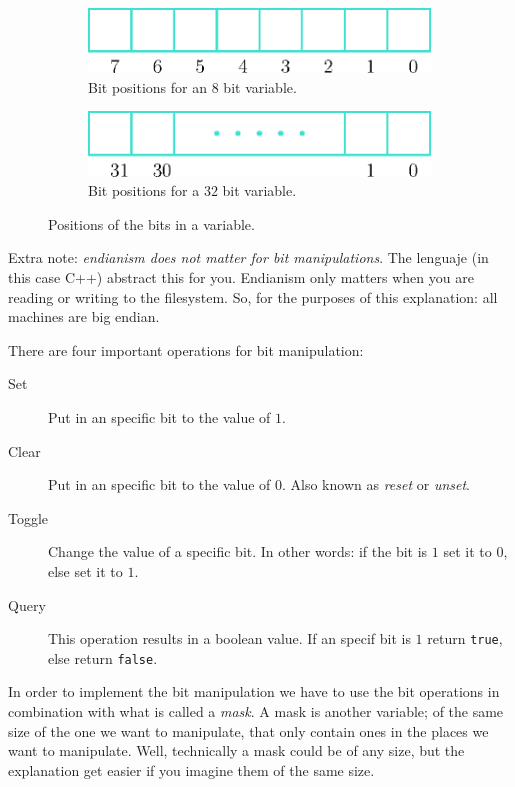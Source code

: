 \begin{figure}[htb]
  \centering
  \begin{subfigure}[b]{0.35\textwidth}
    \includegraphics[width=\textwidth]{img/bitPositions}
    \caption{Bit positions for an $8$ bit variable.}
    \label{fig:bitPosa}
  \end{subfigure}
  \hspace*{1cm}
  \begin{subfigure}[b]{0.35\textwidth}
    \includegraphics[width=\textwidth]{img/bitPositions2}
    \caption{Bit positions for a $32$ bit variable.}
    \label{fig:bitPosb}
  \end{subfigure}
  \caption{Positions of the bits in a variable.}
  \label{fig:bitPos}
\end{figure}

Extra note: \emph{endianism does not matter for bit manipulations}.
The lenguaje (in this case C++) abstract this for you.
Endianism only matters when you are reading or writing to the filesystem.
So, for the purposes of this explanation: all machines are big endian.

There are four important operations for bit manipulation:
\begin{description}
\item[Set] Put in an specific bit to the value of $1$.
\item[Clear] Put in an specific bit to the value of $0$.
             Also known as \emph{reset} or \emph{unset}.
\item[Toggle] Change the value of a specific bit.
              In other words: if the bit is $1$ set it to $0$, else set it to $1$.
\item[Query] This operation results in a boolean value.
             If an specif bit is $1$ return \texttt{true}, else return \texttt{false}.
\end{description}

In order to implement the bit manipulation we have to use the bit operations in combination with what is called a \emph{mask}.
A mask is another variable; of the same size of the one we want to manipulate, that only contain ones in the places we want to manipulate.
Well, technically a mask could be of any size, but the explanation get easier if you imagine them of the same size.

